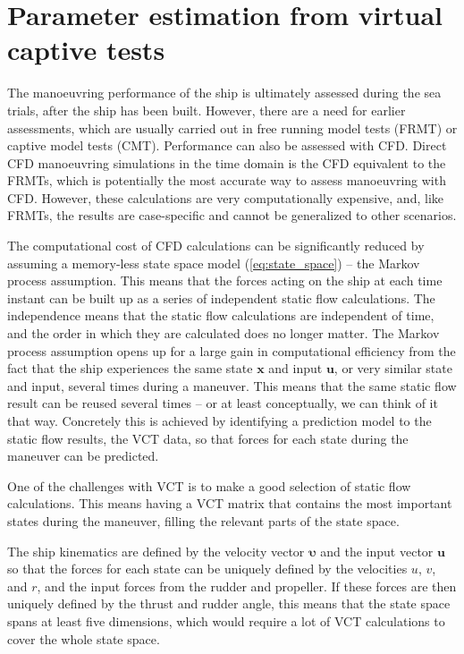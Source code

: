 \section{Parameter estimation from virtual captive tests} \label{sec:VCT}
The manoeuvring performance of the ship is ultimately assessed during the sea trials, after the ship has been built. However, there are a need for earlier assessments, which are usually carried out in free running model tests (FRMT) or captive model tests (CMT). Performance can also be assessed with CFD. Direct CFD manoeuvring simulations in the time domain \cite{el_moctar_rans-based_2014} is the CFD equivalent to the FRMTs, which is potentially the most accurate way to assess manoeuvring with CFD. However, these calculations are very computationally expensive, and, like FRMTs, the results are case-specific and cannot be generalized to other scenarios. 

The computational cost of CFD calculations can be significantly reduced by assuming a memory-less state space model (\autoref{eq:state_space}) -- the Markov process assumption. This means that the forces acting on the ship at each time instant can be built up as a series of independent static flow calculations. 
The independence means that the static flow calculations are independent of time, and the order in which they are calculated does no longer matter. The Markov process assumption opens up for a large gain in computational efficiency from the fact that the ship experiences the same state $\mathbf{x}$ and input $\mathbf{u}$, or very similar state and input, several times during a maneuver. This means that the same static flow result can be reused several times -- or at least conceptually, we can think of it that way. Concretely this is achieved by identifying a prediction model to the static flow results, the VCT data, so that forces for each state during the maneuver can be predicted. 

One of the challenges with VCT is to make a good selection of static flow calculations. This means having a VCT matrix that contains the most important states during the maneuver, filling the relevant parts of the state space.  

The ship kinematics are defined by the velocity vector $\pmb{\bm{\upsilon}}$ and the input vector $\mathbf{u}$ so that the forces for each state can be uniquely defined by the velocities $u$, $v$, and $r$, and the input forces from the rudder and propeller. If these forces are then uniquely defined by the thrust and rudder angle, this means that the state space spans at least five dimensions, which would require a lot of VCT calculations to cover the whole state space.

